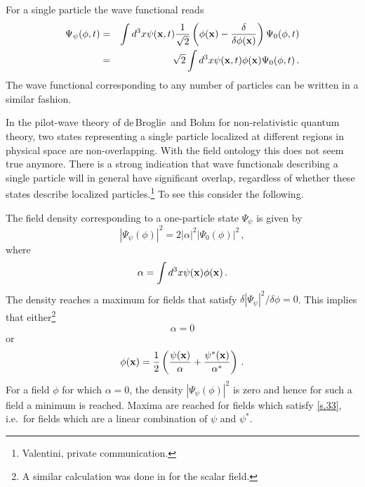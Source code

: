 \documentclass[12pt]{article}
\def\de{\delta}
\newcommand{\db}{de$\,$Broglie}
\begin{document}
For a single particle the wave functional reads
\begin{eqnarray}
\Psi_{\psi} (\phi,t)&=& \int d^3x   \psi({\bf x},t)\frac{1}{\sqrt{2}}\left( \phi({\bf x}) - \frac{\delta }{\delta \phi({\bf x})} \right) \Psi_0(\phi,t) \nonumber\\
&=& \sqrt{2}\int d^3x   \psi({\bf x},t) \phi({\bf x})\Psi_0(\phi,t)  \,.
\label{s.30}
\end{eqnarray}
The wave functional corresponding to any number of particles can be written in a similar fashion.

In the pilot-wave theory of \db\ and Bohm for non-relativistic quantum theory, two states representing a single particle localized at different regions in physical space are non-overlapping. With the field ontology this does not seem true anymore. There is a strong indication that wave functionals describing a single particle will in general have significant overlap, regardless of whether these states describe localized particles.{\footnote{Valentini, private communication.}} To see this consider the following.

The field density corresponding to a one-particle state $\Psi_{\psi}$ is given by
\begin{equation}
\left| \Psi_{\psi} (\phi) \right|^2 = 2 |\alpha|^2  |\Psi_0(\phi) |^2 \,,
\label{s.31}
\end{equation}
where
\begin{equation}
\alpha = \int d^3x \psi({\bf x}) \phi({\bf x}) \,.
\label{s.32}
\end{equation}
The density reaches a maximum for fields that satisfy $\de |\Psi_{\psi}|^2 / \de \phi = 0$. This implies that either{\footnote{A similar calculation was done in \cite{valentini92} for the scalar field.}} 
\begin{equation}
\alpha = 0 
\label{s.32.1}
\end{equation}
or
\begin{equation}
\phi({\bf x}) = \frac{1}{2}\left( \frac{\psi({\bf x})}{\alpha}  + \frac{\psi^*({\bf x})}{\alpha^*} \right)\,.
\label{s.33}
\end{equation}
For a field $\phi$ for which $\alpha = 0$, the density $\left| \Psi_{\psi} (\phi) \right|^2$ is zero and hence for such a field a minimum is reached. Maxima are reached for fields which satisfy \eqref{s.33}, i.e.\ for fields which are a linear combination of $\psi$ and $\psi^*$.
\end{document}
